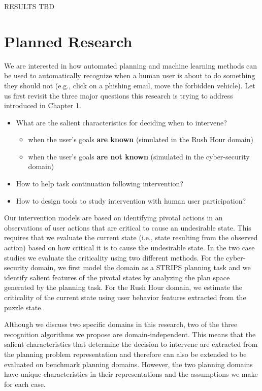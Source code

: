 \documentclass[doctor]{thesis} %
\theoremstyle{plain}
\begin{document}
RESULTS TBD




\chapter{Planned Research}

We are interested in how automated planning and machine learning methods can be used to automatically recognize when a human user is about to do something they should not (e.g., click on a phishing email, move the forbidden vehicle). Let us first revisit the three major questions this research is trying to address introduced in Chapter 1.
\begin{itemize}
\item What are the salient characteristics for deciding when to intervene?
\begin{itemize}
\item when the user's goals \textbf{are known} (simulated in the Rush Hour domain)
\item when the user's goals \textbf{are not known} (simulated in the cyber-security domain)
\end{itemize}
\item How to help task continuation following intervention?
\item How to design tools to study intervention with human user participation?
\end{itemize}

Our intervention models are based on identifying pivotal actions in an observations of user actions that are critical to cause an undesirable state. This requires that we evaluate the
current state (i.e., state resulting from the observed action) based on how critical it is to
cause the undesirable state. In the two case studies we evaluate the criticality using two
different methods. For the cyber-security domain, we first model the domain as a STRIPS planning task and we identify salient features of the pivotal states by analyzing the plan space generated by the planning task. For the Rush Hour domain, we estimate the criticality of the current state using user behavior features extracted from the puzzle state.

Although we discuss two specific domains in this research, two of the three recognition algorithms we propose are domain-independent. This means that the salient characteristics that determine the decision to intervene are extracted from the planning problem representation and therefore can also be extended to be evaluated on benchmark planning domains. However, the two planning domains have unique characteristics in their representations and the assumptions we make for each case.
\end{document}
